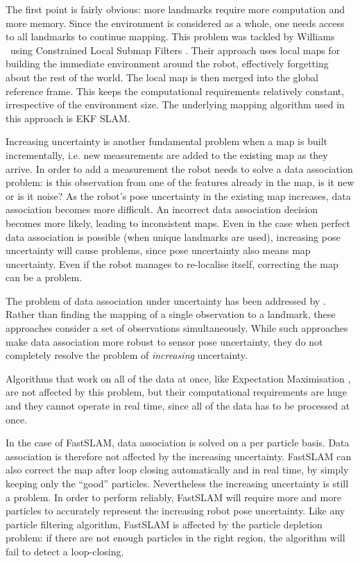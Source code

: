 The first point is fairly obvious: more landmarks require more
computation and more memory. Since the environment is considered as a
whole, one needs access to all landmarks to continue mapping. This
problem was tackled by Williams \etal\ using Constrained Local Submap
Filters \cite{williams:acra2001}. Their approach uses local maps for
building the immediate environment around the robot, effectively
forgetting about the rest of the world. The local map is then merged
into the global reference frame. This keeps the computational
requirements relatively constant, irrespective of the environment
size. The underlying mapping algorithm used in this approach is EKF
SLAM.

Increasing uncertainty is another fundamental problem when a map is
built incrementally, i.e. new measurements are added to the existing
map as they arrive. In order to add a measurement the robot needs to
solve a data association problem: is this observation from one of the
features already in the map, is it new or is it noise?  As the robot's
pose uncertainty in the existing map increases, data association
becomes more difficult. An incorrect data association decision becomes
more likely, leading to inconsistent maps. Even in the case when
perfect data association is possible (when unique landmarks are used),
increasing pose uncertainty will cause problems, since pose
uncertainty also means map uncertainty. Even if the robot manages to
re-localise itself, correcting the map can be a problem.

The problem of data association under uncertainty has been addressed
by \cite{neira01:_data_assoc_stoch_mappin_using,
  tardos02:_mappin_local_indoor_envir_using_sonar_data}.  Rather than
finding the mapping of a single observation to a landmark, these
approaches consider a set of observations simultaneously. While such
approaches make data association more robust to sensor pose
uncertainty, they do not completely resolve the problem of {\it
  increasing} uncertainty.


Algorithms that work on all of the data at once, like Expectation
Maximisation \cite{thrun98:_probab}, are not affected by this problem,
but their computational requirements are huge and they cannot operate
in real time, since all of the data has to be processed at once.

In the case of FastSLAM, data association is solved on a per particle
basis. Data association is therefore not affected by the increasing
uncertainty. FastSLAM can also correct the map after loop closing
automatically and in real time, by simply keeping only the ``good''
particles. Nevertheless the increasing uncertainty is still a
problem. In order to perform reliably, FastSLAM will require more and
more particles to accurately represent the increasing robot pose
uncertainty. Like any particle filtering algorithm, FastSLAM is
affected by the particle depletion problem: if there are not enough
particles in the right region, the algorithm will fail to detect a
loop-closing.

